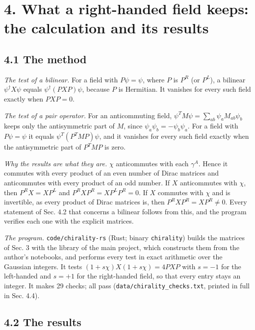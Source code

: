 \documentclass[
  10pt,
]{article}
\begin{document}
\hypertarget{what-a-right-handed-field-keeps-the-calculation-and-its-results}{%
\section{4. What a right-handed field keeps: the calculation and its
results}\label{what-a-right-handed-field-keeps-the-calculation-and-its-results}}

\hypertarget{the-method}{%
\subsection{4.1 The method}\label{the-method}}

\emph{The test of a bilinear.} For a field with \(P\psi=\psi\), where
\(P\) is \(P^R\) (or \(P^L\)), a bilinear \(\psi^\dagger X\psi\) equals
\(\psi^\dagger(PXP)\psi\), because \(P\) is Hermitian. It vanishes for
every such field exactly when \(PXP=0\).

\emph{The test of a pair operator.} For an anticommuting field,
\(\psi^TM\psi=\sum_{ab}\psi_aM_{ab}\psi_b\) keeps only the antisymmetric
part of \(M\), since \(\psi_a\psi_b=-\psi_b\psi_a\). For a field with
\(P\psi=\psi\) it equals \(\psi^T(P^TMP)\psi\), and it vanishes for
every such field exactly when the antisymmetric part of \(P^TMP\) is
zero.

\emph{Why the results are what they are.} \(\chi\) anticommutes with
each \(\gamma^A\). Hence it commutes with every product of an even
number of Dirac matrices and anticommutes with every product of an odd
number. If \(X\) anticommutes with \(\chi\), then \(P^RX=XP^L\) and
\(P^RXP^R=XP^LP^R=0\). If \(X\) commutes with \(\chi\) and is
invertible, as every product of Dirac matrices is, then
\(P^RXP^R=XP^R\neq0\). Every statement of Sec. 4.2 that concerns a
bilinear follows from this, and the program verifies each one with the
explicit matrices.

\emph{The program.} \texttt{code/chirality-rs} (Rust; binary
\texttt{chirality}) builds the matrices of Sec. 3 with the library of
the main project, which constructs them from the author's notebooks, and
performs every test in exact arithmetic over the Gaussian integers. It
tests \((1+s\chi)X(1+s\chi)=4PXP\) with \(s=-1\) for the left-handed and
\(s=+1\) for the right-handed field, so that every entry stays an
integer. It makes 29 checks; all pass
(\texttt{data/chirality\_checks.txt}, printed in full in Sec. 4.4).

\hypertarget{the-results}{%
\subsection{4.2 The results}\label{the-results}}
\end{document}
